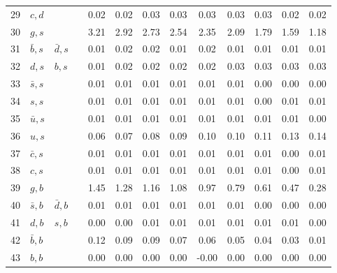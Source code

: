 \begin{tabularx}{\textwidth}{rXXX@{}S@{}S@{}S@{}S@{}S@{}S@{}S@{}S@{}S}
 29 & $c, d$           &                   &                  &  0.02 &  0.02 &  0.03 &  0.03 &  0.03 &  0.03 &  0.03 &  0.02 &  0.02 \\
 30 & $g, s$           &                   &                  &  3.21 &  2.92 &  2.73 &  2.54 &  2.35 &  2.09 &  1.79 &  1.59 &  1.18 \\
 31 & $\bar b, s$      & $\bar d, s$       &                  &  0.01 &  0.02 &  0.02 &  0.01 &  0.02 &  0.01 &  0.01 &  0.01 &  0.01 \\
 32 & $d, s$           & $b, s$            &                  &  0.01 &  0.02 &  0.02 &  0.02 &  0.02 &  0.03 &  0.03 &  0.03 &  0.03 \\
 33 & $\bar s, s$      &                   &                  &  0.01 &  0.01 &  0.01 &  0.01 &  0.01 &  0.01 &  0.00 &  0.00 &  0.00 \\
 34 & $s, s$           &                   &                  &  0.01 &  0.01 &  0.01 &  0.01 &  0.01 &  0.01 &  0.00 &  0.01 &  0.01 \\
 35 & $\bar u, s$      &                   &                  &  0.01 &  0.01 &  0.01 &  0.01 &  0.01 &  0.01 &  0.01 &  0.01 &  0.00 \\
 36 & $u, s$           &                   &                  &  0.06 &  0.07 &  0.08 &  0.09 &  0.10 &  0.10 &  0.11 &  0.13 &  0.14 \\
 37 & $\bar c, s$      &                   &                  &  0.01 &  0.01 &  0.01 &  0.01 &  0.01 &  0.01 &  0.01 &  0.00 &  0.01 \\
 38 & $c, s$           &                   &                  &  0.01 &  0.01 &  0.01 &  0.01 &  0.01 &  0.01 &  0.01 &  0.00 &  0.01 \\
 39 & $g,  b$          &                   &                  &  1.45 &  1.28 &  1.16 &  1.08 &  0.97 &  0.79 &  0.61 &  0.47 &  0.28 \\
 40 & $\bar s, b$      & $\bar d, b$       &                  &  0.01 &  0.01 &  0.01 &  0.01 &  0.01 &  0.01 &  0.00 &  0.00 &  0.00 \\
 41 & $d, b$           & $s, b$            &                  &  0.00 &  0.00 &  0.01 &  0.01 &  0.01 &  0.01 &  0.01 &  0.01 &  0.00 \\
 42 & $\bar b, b$      &                   &                  &  0.12 &  0.09 &  0.09 &  0.07 &  0.06 &  0.05 &  0.04 &  0.03 &  0.01 \\
 43 & $b, b$           &                   &                  &  0.00 &  0.00 &  0.00 &  0.00 & -0.00 &  0.00 &  0.00 &  0.00 &  0.00 \\

\end{tabularx}
